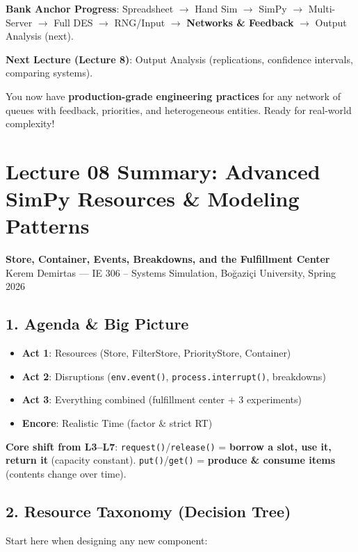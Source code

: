 \documentclass[11pt]{article}
\begin{document}
\textbf{Bank Anchor Progress}: Spreadsheet $\rightarrow$ Hand Sim $\rightarrow$ SimPy $\rightarrow$ Multi-Server $\rightarrow$ Full DES $\rightarrow$ RNG/Input $\rightarrow$ \textbf{Networks \& Feedback} $\rightarrow$ Output Analysis (next).

\textbf{Next Lecture (Lecture 8)}: Output Analysis (replications, confidence intervals, comparing systems).

You now have \textbf{production-grade engineering practices} for any network of queues with feedback, priorities, and heterogeneous entities. Ready for real-world complexity!

\section*{Lecture 08 Summary: Advanced SimPy Resources \& Modeling Patterns}
\textbf{Store, Container, Events, Breakdowns, and the Fulfillment Center}
Kerem Demirtas --- IE 306 -- Systems Simulation, Boğaziçi University, Spring 2026

\subsection*{1. Agenda \& Big Picture}
\begin{itemize}[leftmargin=*]
\item \textbf{Act 1}: Resources (Store, FilterStore, PriorityStore, Container)  
\item \textbf{Act 2}: Disruptions (\texttt{env.event()}, \texttt{process.interrupt()}, breakdowns)  
\item \textbf{Act 3}: Everything combined (fulfillment center + 3 experiments)  
\item \textbf{Encore}: Realistic Time (factor \& strict RT)
\end{itemize}

\textbf{Core shift from L3--L7}:  
\texttt{request()}/\texttt{release()} = \textbf{borrow a slot, use it, return it} (capacity constant).  
\texttt{put()}/\texttt{get()} = \textbf{produce \& consume items} (contents change over time).

\subsection*{2. Resource Taxonomy (Decision Tree)}
Start here when designing any new component:
\end{document}
